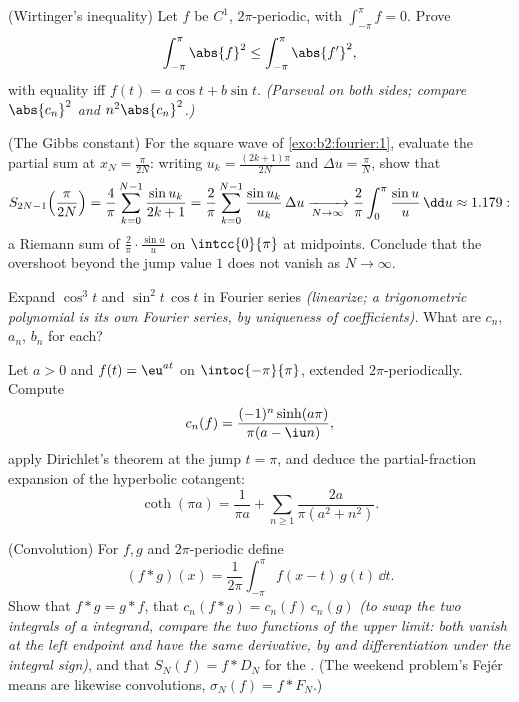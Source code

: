 \begin{exercise}[$\star\star\star$]\label{exo:b2:fourier:7}
(Wirtinger's inequality) Let $f$ be $C^1$, $2\pi$-periodic, with
$\int_{-\pi}^{\pi} f = 0$. Prove
\[
\int_{-\pi}^{\pi} \abs{f}^2 \leq \int_{-\pi}^{\pi} \abs{f'}^2 ,
\]
with equality iff $f(t) = a\cos t + b\sin t$. \emph{(Parseval on
both sides; compare $\abs{c_n}^2$ and $n^2\abs{c_n}^2$.)}
\end{exercise}

\begin{exercise}[$\star\star\star$]\label{exo:b2:fourier:8}
(The Gibbs constant) For the square wave of
\cref{exo:b2:fourier:1}, evaluate the partial sum at $x_N =
\frac{\pi}{2N}$: writing $u_k = \frac{(2k+1)\pi}{2N}$ and $\Delta u
= \frac{\pi}{N}$, show that
\[
S_{2N-1}\Bigl(\frac{\pi}{2N}\Bigr)
= \frac{4}{\pi}\sum_{k=0}^{N-1} \frac{\sin u_k}{2k+1}
= \frac{2}{\pi}\sum_{k=0}^{N-1} \frac{\sin u_k}{u_k}\,\Delta u
\xrightarrow[N\to\infty]{}
\frac{2}{\pi}\int_0^{\pi}\frac{\sin u}{u}\,\dd u \approx 1.179 :
\]
a Riemann sum of $\frac{2}{\pi}\cdot\frac{\sin u}{u}$ on
$\intcc{0}{\pi}$ at midpoints. Conclude that the overshoot beyond
the jump value $1$ does not vanish as $N \to \infty$.
\end{exercise}

\begin{exercise}[$\star$]\label{exo:b2:fourier:9}
Expand $\cos^3 t$ and $\sin^2 t\,\cos t$ in Fourier series
\emph{(linearize; a trigonometric polynomial is its own Fourier
series, by uniqueness of coefficients)}. What are $c_n$,
$a_n$, $b_n$ for each?
\end{exercise}

\begin{exercise}[$\star\star$]\label{exo:b2:fourier:10}
Let $a > 0$ and $f(t) = \eu^{at}$ on $\intoc{-\pi}{\pi}$,
extended $2\pi$-periodically. Compute
\[
c_n(f) = \frac{(-1)^n\sinh(a\pi)}{\pi(a - \iu n)} ,
\]
apply Dirichlet's theorem at the jump $t = \pi$, and deduce the
partial-fraction expansion of the hyperbolic cotangent:
\[
\coth(\pi a) = \frac{1}{\pi a} + \sum_{n\geq1}
\frac{2a}{\pi(a^2 + n^2)} .
\]
\end{exercise}

\begin{exercise}[$\star\star$]\label{exo:b2:fourier:11}
(Convolution) For $f, g$  and $2\pi$-periodic define
\[
(f * g)(x) = \frac{1}{2\pi}\int_{-\pi}^{\pi} f(x - t)\,g(t)\,
\dd t .
\]
Show that $f * g = g * f$, that $c_n(f*g) = c_n(f)\,c_n(g)$
\emph{(to swap the two integrals of a  integrand,
compare the two functions of the upper limit: both vanish at the
left endpoint and have the same derivative, by  and
differentiation under the integral sign)}, and that $S_N(f) =
f * D_N$ for the . (The weekend problem's
Fej\'er means are likewise convolutions, $\sigma_N(f) = f *
F_N$.)
\end{exercise}

